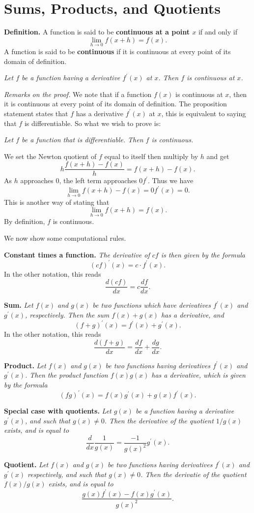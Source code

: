 \section*{Sums, Products, and Quotients}

\textbf{Definition.} A function is said to be \textbf{continuous at a point $x$} if and only if
\[\lim_{h\to0} f(x + h) = f(x).\]
A function is said to be \textbf{continuous} if it is continuous at every point of its domain of definition.

\begin{center}
\textit{Let $f$ be a function having a derivative $f^\prime(x)$ at $x$. Then $f$ is continuous at $x$.}
\end{center}

\textit{Remarks on the proof.}
We note that if a function $f(x)$ is continuous at $x$, then it is continuous at every point of its domain of
definition.
The proposition statement states that $f$ has a derivative $f^\prime(x)$ at $x$, this is equivalent to saying that
$f$ is differentiable. So what we wish to prove is:

\begin{center}
\textit{Let $f$ be a function that is differentiable. Then $f$ is continuous.}
\end{center}

We set the Newton quotient of $f$ equal to itself then multiply by $h$ and get
\[h \frac{f(x + h) - f(x)}{h} = f(x + h) - f(x).\]
As $h$ approaches 0, the left term approaches $0f^\prime$. Thus we have
\[\lim_{h\to0} f(x + h) - f(x) = 0f^\prime(x) = 0.\]
This is another way of stating that
\[\lim_{h\to0} f(x + h) = f(x).\]
By definition, $f$ is continuous.

We now show some computational rules.

\textbf{Constant times a function.} \textit{The derivative of $cf$ is then given by the formula}
\[(cf)^\prime(x) = c \cdot f^\prime(x).\]
In the other notation, this reads
\[\frac{d(cf)}{dx} = c \frac{df}{dx}.\]

\textbf{Sum.} \textit{Let $f(x)$ and $g(x)$ be two functions which have derivatives $f^\prime(x)$ and $g^\prime(x)$,
  respectively. Then the sum $f(x) + g(x)$ has a derivative, and}
\[(f + g)^\prime(x) = f^\prime(x) + g^\prime(x).\]
In the other notation, this reads
\[\frac{d(f + g)}{dx} = \frac{df}{dx} + \frac{dg}{dx}.\]

\textbf{Product.} \textit{Let $f(x)$ and $g(x)$ be two functions having derivatives $f^\prime(x)$ and $g^\prime(x)$.
  Then the product function $f(x)g(x)$ has a derivative, which is given by the formula}
\[(fg)^\prime(x) = f(x)g^\prime(x) + g(x)f^\prime(x).\]

\textbf{Special case with quotients.} \textit{Let $g(x)$ be a function having a derivative $g^\prime(x)$, and such
  that $g(x) \ne 0$. Then the derivative of the quotient $1/g(x)$ exists, and is equal to}
\[\frac{d}{dx} \frac{1}{g(x)} = \frac{-1}{g(x)^2} g^\prime(x).\]

\textbf{Quotient.} \textit{Let $f(x)$ and $g(x)$ be two functions having derivatives $f^\prime(x)$ and $g^\prime(x)$
  respectively, and such that $g(x) \ne 0$. Then the derivatie of the quotient $f(x)/g(x)$ exists, and is equal to}
\[\frac{g(x)f^\prime(x) - f(x)g^\prime(x)}{g(x)^2}.\]
